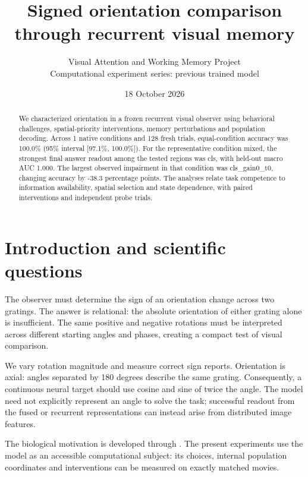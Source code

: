 \documentclass[11pt]{article}
\begin{document}
\title{\color{ink}Signed orientation comparison through recurrent visual memory}
\author{Visual Attention and Working Memory Project\\Computational experiment series: previous trained model}\date{18 October 2026}\maketitle
\begin{abstract}
We characterized orientation in a frozen recurrent visual observer using behavioral challenges, spatial-priority interventions, memory perturbations and population decoding. Across 1 native conditions and 128 fresh trials, equal-condition accuracy was 100.0\% (95\% interval [97.1\%, 100.0\%]). For the representative condition mixed, the strongest final answer readout among the tested regions was cls, with held-out macro AUC 1.000. The largest observed impairment in that condition was cls\_\allowbreak{}gain0\_\allowbreak{}t0, changing accuracy by -38.3 percentage points. The analyses relate task competence to information availability, spatial selection and state dependence, with paired interventions and independent probe trials.
\end{abstract}
\section{Introduction and scientific questions}
The observer must determine the sign of an orientation change across two gratings. The answer is relational: the absolute orientation of either grating alone is insufficient. The same positive and negative rotations must be interpreted across different starting angles and phases, creating a compact test of visual comparison.

We vary rotation magnitude and measure correct sign reports. Orientation is axial: angles separated by 180 degrees describe the same grating. Consequently, a continuous neural target should use cosine and sine of twice the angle. The model need not explicitly represent an angle to solve the task; successful readout from the fused or recurrent representations can instead arise from distributed image features.

The biological motivation is developed through \cite{frequency}. The present experiments use the model as an accessible computational subject: its choices, internal population coordinates and interventions can be measured on exactly matched movies.
\end{document}
